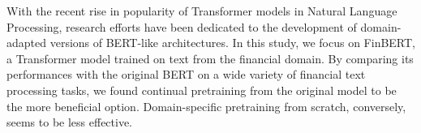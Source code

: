With the recent rise in popularity of Transformer models in Natural Language Processing, research efforts have been dedicated to the development of domain-adapted versions of BERT-like architectures. In this study, we focus on FinBERT, a Transformer model trained on text from the financial domain. By comparing its performances with the original BERT on a wide variety of financial text processing tasks, we found continual pretraining from the original model to be the more beneficial option. Domain-specific pretraining from scratch, conversely, seems to be less effective.
